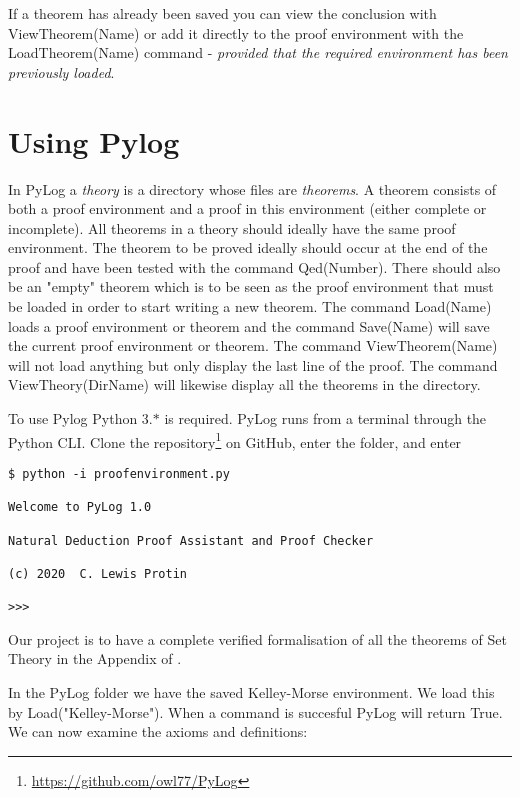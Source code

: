 \documentclass[a4paper,12pt,leqno]{article}
\numberwithin{equation}{section}
\begin{document}
If a theorem has already been saved you can view the conclusion with ViewTheorem(Name) or add it directly to the proof environment with the LoadTheorem(Name) command - \emph{provided that the required environment has been previously loaded}.

\section*{Using Pylog}

In PyLog a \emph{theory} is a directory whose files are \emph{theorems}. A theorem consists of both a proof environment and a proof in this environment (either complete or incomplete).  All theorems in a theory should ideally have the same proof environment. The theorem to be proved ideally should occur at the end of the proof and have been tested with the command Qed(Number).
There should also be an "empty" theorem which is to be seen as the proof environment that must be loaded in order to start writing a new theorem. The command Load(Name) loads a proof environment or theorem and the command Save(Name) will save the current proof environment or theorem. The command ViewTheorem(Name) will not load anything but only display the last line of the proof. The command ViewTheory(DirName) will likewise display all the theorems in the directory.

To use Pylog Python 3.$*$ is required. PyLog runs from a terminal through the Python CLI.
  Clone the repository\footnote{\url{https://github.com/owl77/PyLog}} on GitHub, enter the folder, and enter
    \begin{verbatim}
$ python -i proofenvironment.py

Welcome to PyLog 1.0

Natural Deduction Proof Assistant and Proof Checker

(c) 2020  C. Lewis Protin

>>> 
 \end{verbatim}	


Our project is to have a complete verified formalisation of all the theorems of Set Theory in the Appendix of \cite{kel}.


In the PyLog folder we have the saved Kelley-Morse environment. We load this by Load("Kelley-Morse"). When a command is succesful PyLog will return True. We can now examine the axioms and definitions:
\end{document}
